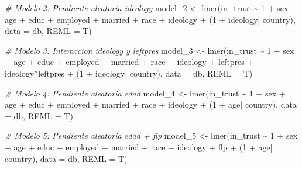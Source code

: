 \documentclass[
  12pt,
  a4paper,
]{article}
\newenvironment{Shaded}{\begin{snugshade}}{\end{snugshade}}
\newcommand{\AttributeTok}[1]{\textcolor[rgb]{0.77,0.63,0.00}{#1}}
\newcommand{\CommentTok}[1]{\textcolor[rgb]{0.56,0.35,0.01}{\textit{#1}}}
\newcommand{\DecValTok}[1]{\textcolor[rgb]{0.00,0.00,0.81}{#1}}
\newcommand{\FunctionTok}[1]{\textcolor[rgb]{0.00,0.00,0.00}{#1}}
\newcommand{\NormalTok}[1]{#1}
\newcommand{\OtherTok}[1]{\textcolor[rgb]{0.56,0.35,0.01}{#1}}
\newcommand{\SpecialCharTok}[1]{\textcolor[rgb]{0.00,0.00,0.00}{#1}}
\begin{document}
\begin{Shaded}
\begin{Highlighting}[]
\CommentTok{\# Modelo 2: Pendiente aleatoria ideology}
\NormalTok{model\_2 }\OtherTok{\textless{}{-}} \FunctionTok{lmer}\NormalTok{(in\_trust }\SpecialCharTok{\textasciitilde{}} \DecValTok{1} \SpecialCharTok{+}\NormalTok{ sex }\SpecialCharTok{+}\NormalTok{ age }\SpecialCharTok{+}\NormalTok{ educ }\SpecialCharTok{+}\NormalTok{ employed }\SpecialCharTok{+}\NormalTok{ married }\SpecialCharTok{+}
\NormalTok{                race }\SpecialCharTok{+}\NormalTok{ ideology }\SpecialCharTok{+}\NormalTok{ (}\DecValTok{1} \SpecialCharTok{+}\NormalTok{ ideology}\SpecialCharTok{|}\NormalTok{ country),}
                \AttributeTok{data =}\NormalTok{ db, }
                \AttributeTok{REML =}\NormalTok{ T)}

\CommentTok{\# Modelo 3: Interaccion ideology y leftpres}
\NormalTok{model\_3 }\OtherTok{\textless{}{-}} \FunctionTok{lmer}\NormalTok{(in\_trust }\SpecialCharTok{\textasciitilde{}} \DecValTok{1} \SpecialCharTok{+}\NormalTok{ sex }\SpecialCharTok{+}\NormalTok{ age }\SpecialCharTok{+}\NormalTok{ educ }\SpecialCharTok{+}\NormalTok{ employed }\SpecialCharTok{+}\NormalTok{ married }\SpecialCharTok{+}
\NormalTok{                race }\SpecialCharTok{+}\NormalTok{ ideology }\SpecialCharTok{+}\NormalTok{ leftpres }\SpecialCharTok{+}\NormalTok{ ideology}\SpecialCharTok{*}\NormalTok{leftpres }\SpecialCharTok{+} 
\NormalTok{                (}\DecValTok{1} \SpecialCharTok{+}\NormalTok{ ideology}\SpecialCharTok{|}\NormalTok{ country),}
                \AttributeTok{data =}\NormalTok{ db, }
                \AttributeTok{REML =}\NormalTok{ T)}

\CommentTok{\# Modelo 4: Pendiente aleatoria edad}
\NormalTok{model\_4 }\OtherTok{\textless{}{-}} \FunctionTok{lmer}\NormalTok{(in\_trust }\SpecialCharTok{\textasciitilde{}} \DecValTok{1} \SpecialCharTok{+}\NormalTok{ sex }\SpecialCharTok{+}\NormalTok{ age }\SpecialCharTok{+}\NormalTok{ educ }\SpecialCharTok{+}\NormalTok{ employed }\SpecialCharTok{+}\NormalTok{ married }\SpecialCharTok{+}
\NormalTok{                race }\SpecialCharTok{+}\NormalTok{ ideology }\SpecialCharTok{+}\NormalTok{ (}\DecValTok{1} \SpecialCharTok{+}\NormalTok{ age}\SpecialCharTok{|}\NormalTok{ country),}
                \AttributeTok{data =}\NormalTok{ db, }
                \AttributeTok{REML =}\NormalTok{ T)}

\CommentTok{\# Modelo 5: Pendiente aleatoria edad + flp}
\NormalTok{model\_5 }\OtherTok{\textless{}{-}} \FunctionTok{lmer}\NormalTok{(in\_trust }\SpecialCharTok{\textasciitilde{}} \DecValTok{1} \SpecialCharTok{+}\NormalTok{ sex }\SpecialCharTok{+}\NormalTok{ age }\SpecialCharTok{+}\NormalTok{ educ }\SpecialCharTok{+}\NormalTok{ employed }\SpecialCharTok{+}\NormalTok{ married }\SpecialCharTok{+}
\NormalTok{                race }\SpecialCharTok{+}\NormalTok{ ideology }\SpecialCharTok{+}\NormalTok{ flp }\SpecialCharTok{+}\NormalTok{ (}\DecValTok{1} \SpecialCharTok{+}\NormalTok{ age}\SpecialCharTok{|}\NormalTok{ country),}
                \AttributeTok{data =}\NormalTok{ db, }
                \AttributeTok{REML =}\NormalTok{ T)}


\end{Highlighting}
\end{Shaded}
\end{document}
